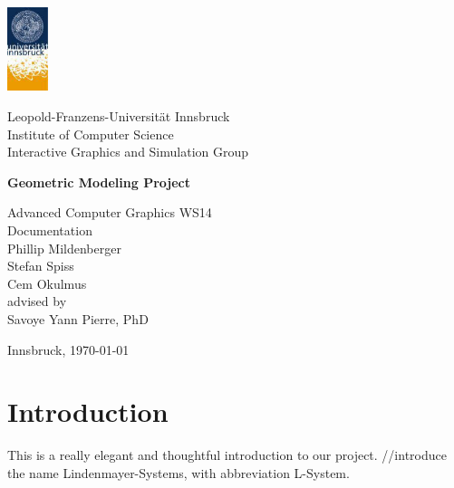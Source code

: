 \documentclass[11pt,a4paper]{article}
\begin{document}

\begin{titlepage} %

\begin{center}
\includegraphics[width=1.2cm]{images/uibk}

\begin{large}
Leopold-Franzens-Universität Innsbruck\\[5mm]
Institute of Computer Science\\
Interactive Graphics and Simulation Group\\[25mm]
\end{large}

{\LARGE \bf Geometric Modeling Project}

Advanced Computer Graphics WS14\\ 
Documentation\\[15mm]

Phillip Mildenberger\\
Stefan Spiss\\
Cem Okulmus\\[35mm]

advised by\\
Savoye Yann Pierre, PhD\\[10mm]

\vfill


Innsbruck, \today
\end{center}

\end{titlepage}



\section{Introduction}
This is a really elegant and thoughtful introduction to our project. 
//introduce the name Lindenmayer-Systems, with abbreviation L-System. 
\end{document}
